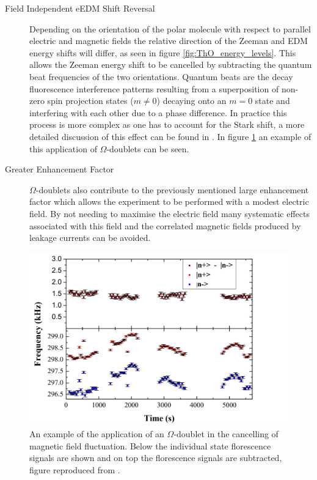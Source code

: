\begin{description}
    \item[Field Independent eEDM Shift Reversal] Depending on the orientation of the polar molecule with respect to parallel electric and magnetic fields the relative direction of the Zeeman and EDM energy shifts will differ, as seen in figure \ref{fig:ThO_energy_levels}. This allows the Zeeman energy shift to be cancelled by subtracting the quantum beat frequencies of the two orientations. Quantum beats are the decay fluorescence interference patterns resulting from a superposition of non-zero spin projection states ($m \neq 0$) decaying onto an $m=0$ state and interfering with each other due to a phase difference. In practice this process is more complex as one has to account for the Stark shift, a more detailed discussion of this effect can be found in \cite{Hamilton_2010}. In figure \ref{fig:comagnetometer_in_action} an example of this application of $\Omega$-doublets can be seen.
    
    \item[Greater Enhancement Factor] $\Omega$-doublets also contribute to the previously mentioned large enhancement factor which allows the experiment to be performed with a modest electric field. By not needing to maximise the electric field many systematic effects associated with this field and the correlated magnetic fields produced by leakage currents can be avoided.
\end{description}

\begin{figure}[h]
    \centering
    \includegraphics[width=120mm,scale=0.5]{images/magnetometer.PNG}
    \caption{An example of the application of an $\Omega$-doublet in the cancelling of magnetic field fluctuation. Below the individual state florescence signals are shown and on top the florescence signals are subtracted, figure reproduced from \cite{Hamilton_2010}.}
    \label{fig:comagnetometer_in_action}
\end{figure}

